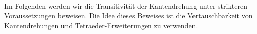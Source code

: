 \documentclass[12pt,titlepage,twoside,cleardoublepage]{article}
\theoremstyle{nummermitklammern}
\numberwithin{equation}{section}
\begin{document}

\\
Im Folgenden werden wir die Transitivität der Kantendrehung unter strikteren Voraussetzungen beweisen. Die Idee dieses Beweises ist die Vertauschbarkeit von Kantendrehungen und Tetraeder-Erweiterungen zu verwenden. \\
\end{document}
